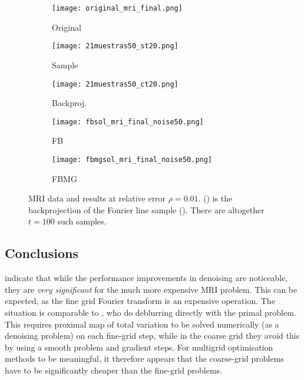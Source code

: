 \documentclass[a4paper,english]{jnsao}
\theoremstyle{definition}
\numberwithin{algorithm}{section}
\def\relerr{\rho}
\begin{document}
\begin{figure}[t]
    \centering
    \begin{subfigure}{.195\textwidth}
        \centering
        \texttt{[image: original\_mri\_final.png]}
        \caption{Original}
        \label{fig:original:image:mri}
    \end{subfigure}%
    \begin{subfigure}{.195\textwidth}
        \centering
        \texttt{[image: 21muestras50\_st20.png]}
        \caption{Sample}
        \label{fig:noisy:line:sample:mri}
    \end{subfigure}%
    \begin{subfigure}{.195\textwidth}
        \centering
        \texttt{[image: 21muestras50\_ct20.png]}
        \caption{Backproj.}
        \label{fig:noisy:transform:sample:mri}
    \end{subfigure}%
    \begin{subfigure}{.195\textwidth}
        \centering
        \texttt{[image: fbsol\_mri\_final\_noise50.png]}
        \caption{FB}
        \label{fig:fb:solution:image:mri}
    \end{subfigure}%
    \begin{subfigure}{.195\textwidth}
        \centering
        \texttt{[image: fbmgsol\_mri\_final\_noise50.png]}
        \caption{FBMG}
        \label{fig:fbmg:solution:image:mri}
    \end{subfigure}%
    \caption{MRI data and results at relative error $\relerr=0.01$.
    () is the backprojection of the Fourier line sample ().
    There are altogether $t=100$ such samples.
    }
    \label{fig:mri:compare:FB:FBMG:mri}
\end{figure}

\subsection{Conclusions}

 indicate that while the performance improvements in denoising are noticeable, they are \emph{very significant} for the much more expensive MRI problem.
This can be expected, as the fine grid Fourier transform is an expensive operation.
The situation is comparable to \cite{parpas2017multilevel}, who do deblurring directly with the primal problem.
This requires proximal map of total variation to be solved numerically (as a denoising problem) on each fine-grid step, while in the coarse grid they avoid this by using a smooth problem and gradient steps.
For multigrid optimisation methods to be meaningful, it therefore appears that the coarse-grid problems have to be significantly cheaper than the fine-grid problems.



\end{document}
